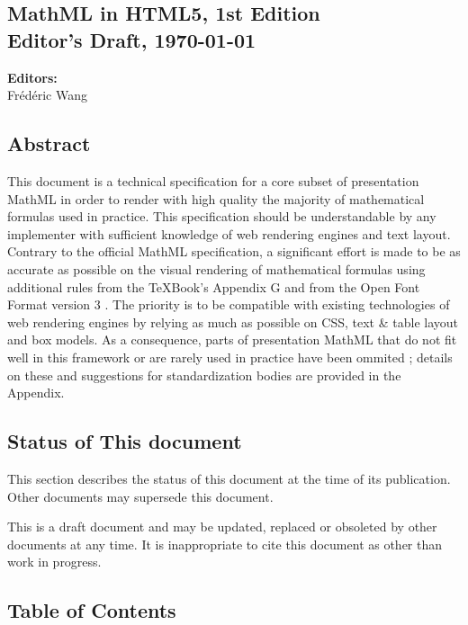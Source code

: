 \subsection*{MathML in HTML5, 1st Edition \\Editor's Draft, \today}

\textbf{Editors:} \\
Frédéric Wang

\subsection*{Abstract}

This document is a technical specification for a core subset of presentation
MathML \cite{MathML3} in order to render with high quality the majority of
mathematical formulas used in practice.
This specification should be understandable by any implementer with
sufficient knowledge of web rendering engines and text layout.
Contrary to the official MathML specification, a significant effort is made to
be as accurate as possible on the visual rendering of mathematical formulas
using additional rules from the \TeX Book's Appendix G \cite{TeXBook} and from
the Open Font Format version 3 \cite{OpenFontFormat3}.
The priority is to be compatible with existing technologies of web
rendering engines \cite{HTML5} by relying as much as possible on CSS, text \&
table layout and box models. As a consequence, parts of presentation MathML
that do not fit well in this framework or are rarely used in practice
have been ommited ; details on these and suggestions for standardization bodies
are provided in the Appendix.

\subsection*{Status of This document}

This section describes the status of this document at the time of its
publication. Other documents may supersede this document.

This is a draft document and may be updated, replaced or obsoleted by other
documents at any time. It is inappropriate to cite this document as other than
work in progress.

\subsection*{Table of Contents}

\renewcommand\contentsname{}
\tableofcontents
